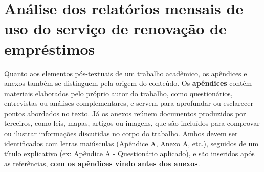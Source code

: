 
{\let\clearpage\relax \chapter{\textbf{Análise dos relatórios mensais de uso do serviço de renovação de empréstimos}}}

Quanto aos elementos pós-textuais de um trabalho acadêmico, os apêndices e anexos também se distinguem pela origem do conteúdo. Os \textbf{apêndices} contêm materiais elaborados pelo próprio autor do trabalho, como questionários, entrevistas ou análises complementares, e servem para aprofundar ou esclarecer pontos abordados no texto. Já os anexos reúnem documentos produzidos por terceiros, como leis, mapas, artigos ou imagens, que são incluídos para comprovar ou ilustrar informações discutidas no corpo do trabalho. Ambos devem ser identificados com letras maiúsculas (Apêndice A, Anexo A, etc.), seguidos de um título explicativo (ex: Apêndice A - Questionário aplicado), e são inseridos após as referências, \textbf{com os apêndices vindo antes dos anexos}.
